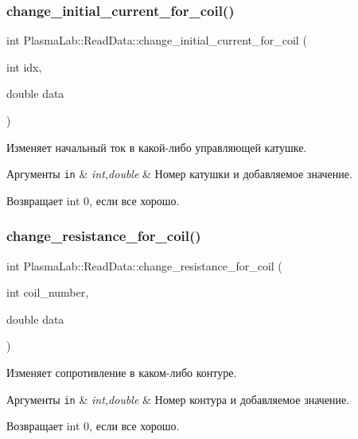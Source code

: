 \subsubsection{\texorpdfstring{change\+\_\+initial\+\_\+current\+\_\+for\+\_\+coil()}{change\_initial\_current\_for\_coil()}}
{\footnotesize\ttfamily int Plasma\+Lab\+::\+Read\+Data\+::change\+\_\+initial\+\_\+current\+\_\+for\+\_\+coil (\begin{DoxyParamCaption}\item[{int}]{idx,  }\item[{double}]{data }\end{DoxyParamCaption})\hspace{0.3cm}{\ttfamily [inline]}}

Изменяет начальный ток в какой-\/либо управляющей катушке. 
\begin{DoxyParams}[1]{Аргументы}
\mbox{\tt in}  & {\em int,double} & Номер катушки и добавляемое значение. \\
\hline
\end{DoxyParams}
\begin{DoxyReturn}{Возвращает}
int 0, если все хорошо. 
\end{DoxyReturn}
\mbox{\label{class_plasma_lab_1_1_read_data_af99edda5c788d9f21adc1388cc78b7ad}} 
\subsubsection{\texorpdfstring{change\+\_\+resistance\+\_\+for\+\_\+coil()}{change\_resistance\_for\_coil()}}
{\footnotesize\ttfamily int Plasma\+Lab\+::\+Read\+Data\+::change\+\_\+resistance\+\_\+for\+\_\+coil (\begin{DoxyParamCaption}\item[{int}]{coil\+\_\+number,  }\item[{double}]{data }\end{DoxyParamCaption})\hspace{0.3cm}{\ttfamily [inline]}}

Изменяет сопротивление в каком-\/либо контуре. 
\begin{DoxyParams}[1]{Аргументы}
\mbox{\tt in}  & {\em int,double} & Номер контура и добавляемое значение. \\
\hline
\end{DoxyParams}
\begin{DoxyReturn}{Возвращает}
int 0, если все хорошо. 
\end{DoxyReturn}
\mbox{\label{class_plasma_lab_1_1_read_data_a3dd8682eaed60689b7e9e34b64decf6c}} 
